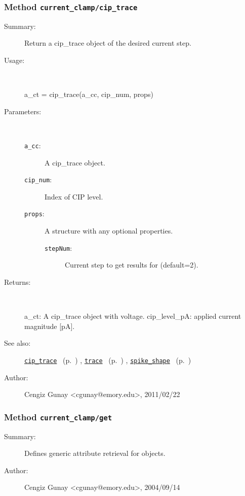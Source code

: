 \subsubsection[Method \texttt{cip\_trace}]{Method \texttt{current\_clamp/cip\_trace}}%
%
\label{ref_current_clamp__cip_trace}%
\hypertarget{ref_current_clamp__cip_trace}{}%
\begin{description}
\item[Summary:]Return a cip\_trace object of the desired current step.
%
\item[Usage:]~%
\begin{lyxcode}%
a\_ct = cip\_trace(a\_cc, cip\_num, props)
%
\end{lyxcode}%
%
%
\item[Parameters:]~
\begin{description}%
\item[\texttt{a\_cc}:]
 A cip\_trace object.
\item[\texttt{cip\_num}:]
 Index of CIP level.
\item[\texttt{props}:]
 A structure with any optional properties.
\begin{description}%
\item[\texttt{stepNum}:]
 Current step to get results for (default=2).
\end{description}%
\end{description}%
%
\item[Returns:
]~

   a\_ct: A cip\_trace object with voltage.
   cip\_level\_pA: applied current magnitude [pA].
%
%
\item[See also:]%
\hyperlink{ref_cip_trace}{\texttt{cip\_trace}}%
\ (p.~\pageref{ref_cip_trace})%
%
, \hyperlink{ref_trace}{\texttt{trace}}%
\ (p.~\pageref{ref_trace})%
%
, \hyperlink{ref_spike_shape}{\texttt{spike\_shape}}%
\ (p.~\pageref{ref_spike_shape})%
%
%
\item[Author:]%
Cengiz Gunay <cgunay@emory.edu>, 2011/02/22
%
\end{description}
\methodline%
\subsubsection[Method \texttt{get}]{Method \texttt{current\_clamp/get}}%
%
\label{ref_current_clamp__get}%
\hypertarget{ref_current_clamp__get}{}%
\begin{description}
\item[Summary:]Defines generic attribute retrieval for objects.
%
%
%
%
%
%
%
\item[Author:]%
Cengiz Gunay <cgunay@emory.edu>, 2004/09/14
%
\end{description}
\methodline%
